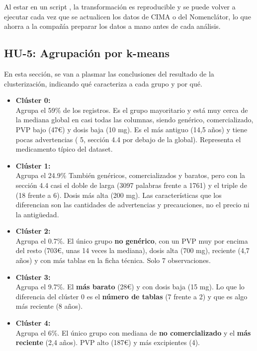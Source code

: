 \documentclass[11pt,a4paper]{article}
\begin{document}
Al estar en un script , la transformación es reproducible y se puede volver a ejecutar cada vez
que se actualicen los datos de CIMA o del Nomenclátor, lo que ahorra a la compañía preparar
los datos a mano antes de cada análisis.

\subsection{HU-5: Agrupación por k-means}
En esta sección, se van a plasmar las conclusiones del resultado de la clusterización, indicando
qué caracteriza a cada grupo y por qué.
\begin{itemize}
  \item \textbf{Clúster 0:}\\
        Agrupa el 59\% de los registros. Es el grupo mayoritario y está muy cerca de la mediana
        global en casi todas las columnas, siendo genérico, comercializado, PVP bajo (47€) y
        dosis baja (10 mg). Es el más antiguo (14,5 años) y tiene pocas advertencias (
        5, sección 4.4 por debajo de la global). Representa el medicamento típico del dataset.
  \item \textbf{Clúster 1:}\\
        Agrupa el 24.9\% También genéricos, comercializados y baratos, pero con la sección 4.4
        casi el doble de larga (3097 palabras frente a 1761) y el triple de  (18 frente a
        6). Dosis más alta (200 mg). Las características que los diferencian son las cantidades
        de advertencias y precauciones, no el precio ni la antigüedad.
  \item \textbf{Clúster 2:}\\
        Agrupa el 0.7\%. El único grupo \textbf{no genérico}, con un PVP muy por encima del resto
        (703€, unas 14 veces la mediana), dosis alta (700 mg), reciente (4,7 años) y con más tablas
        en la ficha técnica. Solo 7 observaciones.
  \item \textbf{Clúster 3:}\\
        Agrupa el 9.7\%. El \textbf{más barato} (28€) y con dosis baja (15 mg). Lo que lo diferencia del
        clúster 0 es el \textbf{número de tablas} (7 frente a 2) y que es algo más reciente (8 años).
  \item \textbf{Clúster 4:}\\
        Agrupa el 6\%. El único grupo con mediana de \textbf{no comercializado} y el \textbf{más reciente}
        (2,4 años). PVP alto (187€) y más excipientes (4).
\end{itemize}
\end{document}
